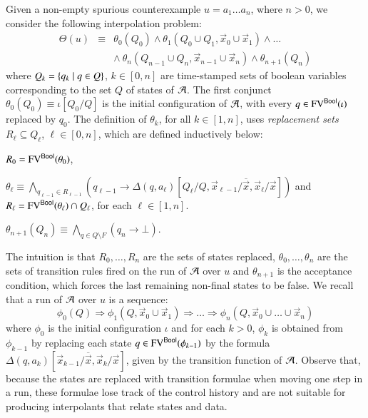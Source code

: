 \documentclass[10pt]{llncs}
\begin{document}
Given a non-empty spurious counterexample $u = a_1\ldots a_n$, where
$n>0$, we consider the following interpolation problem: 
\begin{eqnarray}\label{eq:interpolation-problem}
\Theta(u) & \equiv & \theta_0(Q_0) \wedge \theta_1(Q_0 \cup Q_1,\vec{x}_0
\cup \vec{x}_1) \wedge \ldots \\ 
&& \wedge~ \theta_n(Q_{n-1} \cup Q_n,\vec{x}_{n-1} \cup \vec{x}_n) \wedge \theta_{n+1}(Q_n) \nonumber
\end{eqnarray}
where $Q_k = \left\{ q_k \mid q \in Q \right\}$, $k \in [0,n]$ are time-stamped
sets of boolean variables corresponding to the set $Q$ of states of
$\mathcal{A}$. The first conjunct $\theta_0(Q_0) \equiv \iota[Q_0/Q]$ is the
initial configuration of $\mathcal{A}$, with every $q \in \mathrm{FV}^{\mathsf{Bool}}(\iota)$
replaced by $q_0$. The definition of $\theta_k$, for all $k\in[1,n]$,
uses \emph{replacement sets} $R_\ell \subseteq Q_\ell$, $\ell\in
[0,n]$, which are defined inductively below: \begin{compactitem}
\item $R_0 = \mathrm{FV}^{\mathsf{Bool}}(\theta_0)$,
%
\item $\theta_\ell \equiv \bigwedge_{q_{\ell-1}\in R_{\ell-1}}
  (q_{\ell-1} \rightarrow
  \Delta(q,a_\ell)[Q_\ell/Q,\vec{x}_{\ell-1}/\overline{\vec{x}},\vec{x}_\ell/\vec{x}])$
  and $R_\ell = \mathrm{FV}^{\mathsf{Bool}}(\theta_\ell) \cap Q_\ell$, for each
  $\ell\in[1,n]$.
%
\item $\theta_{n+1}(Q_n) \equiv \bigwedge_{q \in Q \setminus F} (q_n
  \rightarrow \bot)$.
\end{compactitem}
The intuition is that $R_0,\ldots,R_n$ are the sets of states
replaced, $\theta_0, \ldots, \theta_n$ are the sets of transition
rules fired on the run of $\mathcal{A}$ over $u$ and $\theta_{n+1}$ is the
acceptance condition, which forces the last remaining non-final states
to be false.
%
%
%
We recall that a run of $\mathcal{A}$ over $u$ is a sequence: \[\phi_0(Q)
\Rightarrow \phi_1(Q,\vec{x}_0\cup\vec{x}_1) \Rightarrow \ldots
\Rightarrow \phi_n(Q,\vec{x}_0\cup\ldots\cup\vec{x}_n)\] where
$\phi_0$ is the initial configuration $\iota$ and for each $k>0$,
$\phi_k$ is obtained from $\phi_{k-1}$ by replacing each state $q \in
\mathrm{FV}^{\mathsf{Bool}}(\phi_{k-1})$ by the formula
$\Delta(q,a_k)[\vec{x}_{k-1}/\overline{\vec{x}},\vec{x}_k/\vec{x}]$,
given by the transition function of $\mathcal{A}$. Observe that, because the
states are replaced with transition formulae when moving one step in a
run, these formulae lose track of the control history and are not
suitable for producing interpolants that relate states and data.
\end{document}

